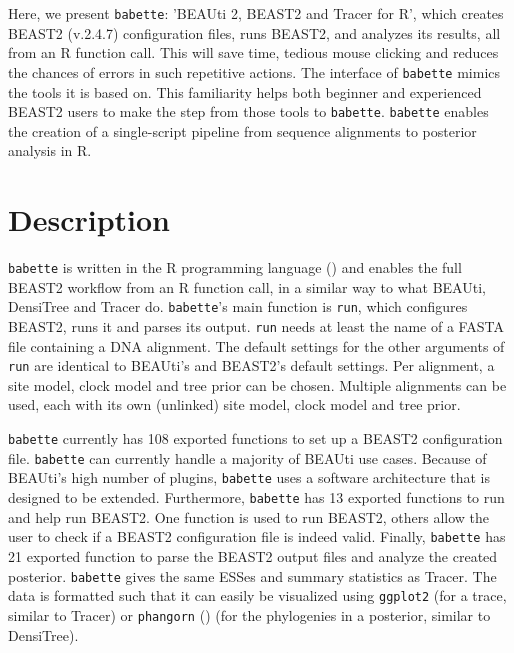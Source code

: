 \documentclass{article}
\begin{document}
Here, we present \verb;babette;:
’BEAUti 2, BEAST2 and Tracer for R’, 
which creates BEAST2 (v.2.4.7) configuration files,
runs BEAST2, and analyzes its results,
all from an R function call. This
will save time, tedious mouse clicking and 
reduces the chances of errors in such repetitive actions.
The interface of \verb;babette; mimics the tools it
is based on. This
familiarity helps both beginner and experienced BEAST2 users 
to make the step from those tools to \verb;babette;.
\verb;babette; enables the creation of a single-script 
pipeline from sequence alignments to posterior analysis in R. 

\section{Description}

\verb;babette; is written in the R programming language (\cite{R})
and enables the full BEAST2 workflow from an R function call,
in a similar way to what BEAUti, DensiTree and Tracer do.
\verb;babette;'s main function is \verb;run;, which
configures BEAST2, runs it and parses its output. 
\verb;run; needs at least the name of a 
FASTA file containing a DNA alignment. 
The default settings for the other arguments of \verb;run; 
are identical to BEAUti's and BEAST2's default settings.
Per alignment, a site model, clock model and tree prior can be chosen.
Multiple alignments can be used, each with its own (unlinked) site model, 
clock model and tree prior.

\verb;babette; currently has 108 exported functions to set up  
a BEAST2 configuration file. 
\verb;babette; can currently handle a majority of BEAUti use cases.
Because of BEAUti's high number of plugins, 
\verb;babette; uses a software architecture that is designed to be extended.
Furthermore, \verb;babette; has 13 exported functions to run and help run BEAST2.
One function is used to run BEAST2, others
allow the user to check if a BEAST2 configuration file is indeed valid.
Finally, \verb;babette; has 21 exported function to parse the BEAST2 output
files and analyze the created posterior. \verb;babette; gives the
same ESSes and summary statistics as Tracer. The data is formatted
such that it can easily be visualized using \verb;ggplot2; (for a trace,
similar to Tracer) or \verb;phangorn; (\cite{phangorn}) (for 
the phylogenies in a posterior, similar to DensiTree). 
\end{document}
